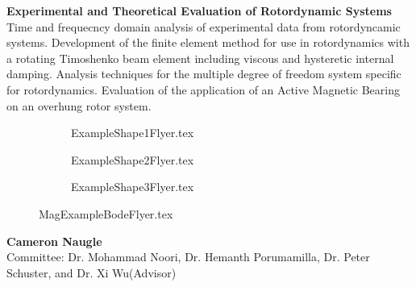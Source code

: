 \documentclass[20pt]{article}
\begin{document}
		\begin{center}
			{\LARGE \textbf{ Experimental and Theoretical Evaluation of Rotordynamic Systems}}\\
			\vspace{0.5cm}
			Time and frequecncy domain analysis of experimental data from rotordyncamic systems. Development of the finite element method for use in rotordynamics with a rotating Timoshenko beam element including viscous and hysteretic internal damping. Analysis techniques for the multiple degree of freedom system specific for rotordynamics. Evaluation of the application of an Active Magnetic Bearing on an overhung rotor system.\\
			\vspace{-.5cm}
\begin{figure}[h!]
	\def\cs{.3}	
	\def\over{3em}
	\def\hl{3em}
	\begin{subfigure}{\cs\textwidth}
		\centering
		\def\width{\linewidth+\over}
		\def\height{\linewidth-\hl}
		{ExampleShape1Flyer.tex}
	\end{subfigure}
	\begin{subfigure}{\cs\textwidth}
		\centering
		\def\width{\linewidth+\over}
		\def\height{\linewidth-\hl}
		{ExampleShape2Flyer.tex}
	\end{subfigure}
	\begin{subfigure}{\cs\textwidth}
		\centering
		\def\width{\linewidth+\over}
		\def\height{\linewidth-\hl}
		{ExampleShape3Flyer.tex}
	\end{subfigure}
\end{figure}
\vspace{-.8cm}
\begin{figure}[h!]
	\centering
	\def\sep{3em}
	\def\width{.55\linewidth}
	\def\height{.25\linewidth}
	{MagExampleBodeFlyer.tex}
\end{figure}
			\textbf{Cameron Naugle}\\
			Committee: Dr. Mohammad Noori, Dr. Hemanth Porumamilla, Dr. Peter Schuster, and Dr. Xi Wu(Advisor)
			\vfill
			

\end{center}
\end{document}
